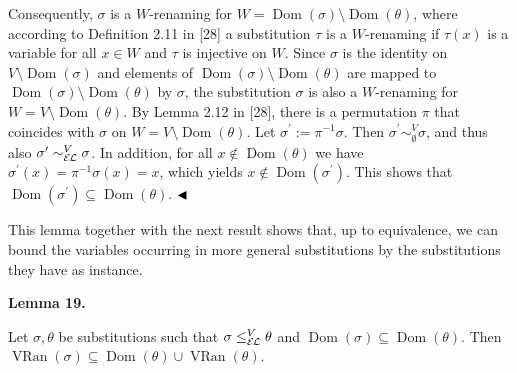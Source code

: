  
 
Consequently, $\sigma$ is a $W$-renaming for $W=\operatorname{Dom}(\sigma)\setminus\operatorname{Dom}(\theta)$, where according to Definition 2.11 in [28] a substitution $\tau$ is a $W$-renaming if $\tau(x)$ is a variable for all $x\in W$ and $\tau$ is injective on $W$. Since $\sigma$ is the identity on $V\setminus\operatorname{Dom}(\sigma)$ and elements of $\operatorname{Dom}(\sigma)\setminus\operatorname{Dom}(\theta)$ are mapped to $\operatorname{Dom}(\sigma)\setminus\operatorname{Dom}(\theta)$ by $\sigma$, the substitution $\sigma$ is also a $W$-renaming for $W=V\setminus\operatorname{Dom}(\theta)$. By Lemma 2.12 in [28], there is a permutation $\pi$ that coincides with $\sigma$ on $W=V\setminus\operatorname{Dom}(\theta)$. Let $\sigma^{\prime}:=\pi^{-1}\sigma$. Then $\sigma^{\prime}\sim_{\emptyset}^{V}\sigma$, and thus also $\sigma^{\prime}\sim_{\mathcal{E\mkern-1.618muL}}^{V}\sigma$. In addition, for all $x\not\in\operatorname{Dom}(\theta)$ we have $\sigma^{\prime}(x)=\pi^{-1}\sigma(x)=x$, which yields $x\not\in\operatorname{Dom}(\sigma^{\prime})$. This shows that $\operatorname{Dom}(\sigma^{\prime})\subseteq\operatorname{Dom}(\theta)$. $\hfill\blacktriangleleft$\par
 
 
 
This lemma together with the next result shows that, up to equivalence, we can bound the variables occurring in more general substitutions by the substitutions they have as instance.\par
 
 
 
\par\medskip\noindent\textbf{Lemma 19.}\par
 
 
Let $\sigma,\theta$ be substitutions such that $\sigma\leq_{\mathcal{E\mkern-1.618muL}}^{V}\theta$ and $\operatorname{Dom}(\sigma)\subseteq\operatorname{Dom}(\theta)$. Then $\operatorname{VRan}(\sigma)\subseteq\operatorname{Dom}(\theta)\cup%
\operatorname{VRan}(\theta)$.\par
 
 
